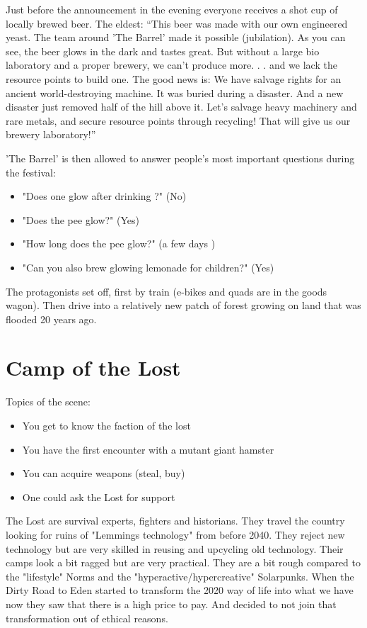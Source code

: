 Just before the announcement in the evening everyone receives a shot cup of locally brewed beer. The eldest: “This beer was made with our own engineered yeast. The team around 'The Barrel' made it possible (jubilation). As you can see, the beer glows in the dark and tastes great. But without a large bio laboratory and a proper brewery, we can't produce more. . . and we lack the resource points to build one. The good news is: We have salvage rights for an ancient world-destroying machine. It was buried during a  disaster. And a new disaster just removed half of the hill above it. Let's salvage heavy machinery and rare metals, and secure resource points through recycling! That will give us our brewery laboratory!”

'The Barrel' is then allowed to answer people's most important questions during the festival: 
\begin{itemize}
\item "Does one glow after drinking ?" (No)
\item "Does the pee glow?" (Yes)
\item "How long does the pee glow?" (a few days )
\item "Can you also brew glowing lemonade for children?" (Yes)
\end{itemize}

The protagonists set off, first by train (e-bikes and quads are in the goods wagon). Then drive into a relatively new patch of forest growing on land that was flooded 20 years ago.


\section{Camp of the Lost}

Topics of the scene:

\begin{itemize}
\item You get to know the faction of the lost
\item You have the first encounter with a mutant giant hamster
\item You can acquire weapons (steal, buy)
\item One could ask the Lost for support
\end{itemize}

\begin{sidebarBox}[title=The Lost]
The Lost are survival experts, fighters and historians. They travel the country looking for ruins of "Lemmings technology" from before 2040. They reject new technology but are very skilled in reusing and upcycling old technology. Their camps look a bit ragged but are very practical. They are a bit rough compared to the "lifestyle" Norms and the "hyperactive/hypercreative" Solarpunks. When the Dirty Road to Eden started to transform the 2020 way of life into what we have now they saw that there is a high price to pay. And decided to not join that transformation out of ethical reasons.
\end{sidebarBox}


